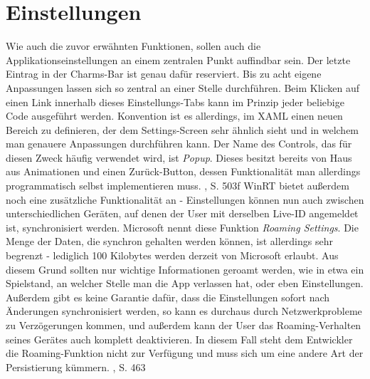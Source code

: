 \documentclass[a4paper,bibtotoc,oneside]{scrbook}
\begin{document}
\section[Einstellungen]{Einstellungen}\label{einstellungen}
Wie auch die zuvor erwähnten Funktionen, sollen auch die Applikationseinstellungen an einem zentralen Punkt auffindbar sein. Der letzte Eintrag in der Charms-Bar ist genau dafür reserviert. Bis zu acht eigene Anpassungen lassen sich so zentral an einer Stelle durchführen.
\newline
\newline
Beim Klicken auf einen Link innerhalb dieses Einstellungs-Tabs kann im Prinzip jeder beliebige Code ausgeführt werden. Konvention ist es allerdings, im XAML einen neuen Bereich zu definieren, der dem Settings-Screen sehr ähnlich sieht und in welchem man genauere Anpassungen durchführen kann. Der Name des Controls, das für diesen Zweck häufig verwendet wird, ist \textit{Popup}. Dieses besitzt bereits von Haus aus Animationen und einen Zurück-Button, dessen Funktionalität man allerdings programmatisch selbst implementieren muss. \cite{ana12}, S. 503f
\newline
\newline
WinRT bietet außerdem noch eine zusätzliche Funktionalität an - Einstellungen können nun auch zwischen unterschiedlichen Geräten, auf denen der User mit derselben Live-ID angemeldet ist, synchronisiert werden. Microsoft nennt diese Funktion \textit{Roaming Settings}. Die Menge der Daten, die synchron gehalten werden können, ist allerdings sehr begrenzt - lediglich 100 Kilobytes werden derzeit von Microsoft erlaubt. Aus diesem Grund sollten nur wichtige Informationen geroamt werden, wie in etwa ein Spielstand, an welcher Stelle man die App verlassen hat, oder eben Einstellungen.
\newline
Außerdem gibt es keine Garantie dafür, dass die Einstellungen sofort nach Änderungen synchronisiert werden, so kann es durchaus durch Netzwerkprobleme zu Verzögerungen kommen, und außerdem kann der User das Roaming-Verhalten seines Gerätes auch komplett deaktivieren. In diesem Fall steht dem Entwickler die Roaming-Funktion nicht zur Verfügung und muss sich um eine andere Art der Persistierung kümmern.
\cite{ana12}, S. 463
\end{document}
